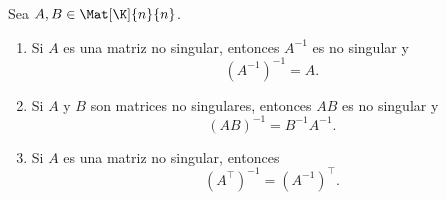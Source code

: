 \documentclass[compacto,10pt]{pubciencias-notas}
\begin{document}
\begin{teo}\label{Sem03Clas02PropInv}
    Sea $A, B \in \Mat[\K]{n}{n}$. 
    \begin{enumerate}
    \item[$a)$] 
        Si $A$ es una matriz no singular, entonces $A^{-1}$ es no singular y 
        \[ 
            (A^{-1})^{-1} = A.
        \]
    \item[$b)$] 
        Si $A$ y $B$ son matrices no singulares, entonces $AB$ es no singular y 
        \[ 
            (AB)^{-1} = B^{-1}A^{-1}.
        \]
    \item[$c)$] 
        Si $A$ es una matriz no singular, entonces
        \[
            {(A^\intercal)}^{-1} = {(A^{-1})}^\intercal.
        \]
    \end{enumerate}
\end{teo}

\end{document}
